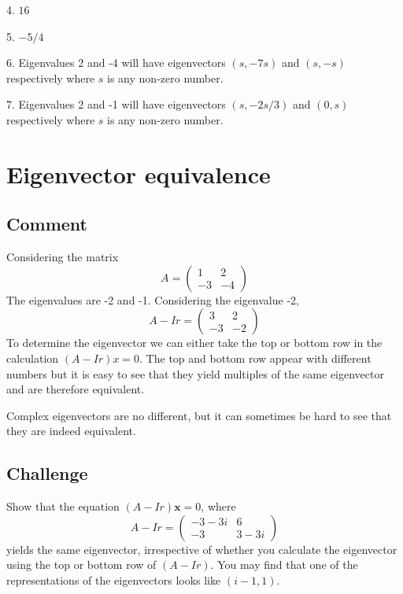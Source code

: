 4. $16$

5. $-5/4$

6. Eigenvalues 2 and -4 will have eigenvectors $(s,-7s)$ and $(s,-s)$ respectively where $s$ is any non-zero number.

7. Eigenvalues 2 and -1 will have eigenvectors $(s,-2s/3)$ and $(0,s)$ respectively where $s$ is any non-zero number.


\newpage
\section{Eigenvector equivalence}

\subsection*{Comment}
Considering the matrix
\begin{equation}
    A = \left(
        \begin{array}{cc}
            1 & 2 \\
            -3 & -4
        \end{array}
    \right)
\end{equation}
The eigenvalues are -2 and -1. Considering the eigenvalue -2, 
\begin{equation}
    A - Ir = \left(
        \begin{array}{cc}
            3 & 2 \\
            -3 & -2
        \end{array}
    \right)
\end{equation}
To determine the eigenvector we can either take the top or bottom row in the calculation $(A - Ir)x = 0$.
The top and bottom row appear with different numbers but it is easy to see that they yield multiples of the same eigenvector and are therefore equivalent.

Complex eigenvectors are no different, but it can sometimes be hard to see that they are indeed equivalent.

\subsection*{Challenge}
Show that the equation $(A - Ir)\bm{x} = {0}$, where
\begin{equation}
     A-Ir = \left(
        \begin{array}{cc}
            -3 -3i & 6 \\
            -3 & 3-3i
        \end{array}
    \right)
\end{equation}
yields the same eigenvector, irrespective of whether you calculate the eigenvector using the top or bottom row of $(A-Ir)$. You may find that one of the representations of the eigenvectors looks like $(i-1,1)$.

